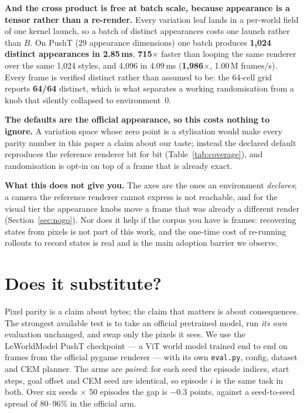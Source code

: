 \documentclass{article}
\begin{document}
\textbf{And the cross product is free at batch scale, because appearance is a
tensor rather than a re-render.} Every variation leaf lands in a per-world field
of one kernel launch, so a batch of distinct appearances costs one launch rather
than $B$. On PushT (29 appearance dimensions) one batch produces \textbf{1,024
distinct appearances in 2.85\,ms}, \textbf{715$\times$} faster than looping the
same renderer over the same 1,024 styles, and 4,096 in 4.09\,ms
(\textbf{1,986$\times$}, 1.00\,M frames/s).
Every frame is verified distinct rather than assumed to be: the 64-cell grid
reports \textbf{64/64} distinct, which is what separates a working randomisation
from a knob that silently collapsed to environment~0.

\textbf{The defaults are the official appearance, so this costs nothing to
ignore.} A variation space whose zero point is a stylisation would make every
parity number in this paper a claim about our taste; instead the declared
default reproduces the reference renderer bit for bit
(Table~\ref{tab:coverage}), and randomisation is opt-in on top of a frame that
is already exact.

\textbf{What this does not give you.} The axes are the ones an environment
\emph{declares}; a camera the reference renderer cannot express is not
reachable, and for the visual tier the appearance knobs move a frame that was
already a different render (Section~\ref{sec:nogo}). Nor does it help if the
corpus you have is frames: recovering states from pixels is not part of this
work, and the one-time cost of re-running rollouts to record states is real and
is the main adoption barrier we observe.

\section{Does it substitute?}
\label{sec:substitute}

Pixel parity is a claim about bytes; the claim that matters is about
consequences. The strongest available test is to take an official pretrained
model, run \emph{its own} evaluation unchanged, and swap only the pixels it
sees. We use the LeWorldModel PushT checkpoint --- a ViT world model trained
end to end on frames from the official pygame renderer --- with its own
\texttt{eval.py}, config, dataset and CEM planner. The arms are
\emph{paired}: for each seed the episode indices, start steps, goal offset and
CEM seed are identical, so episode $i$ is the same task in both. Over six
seeds $\times$ 50 episodes the gap is $-0.3$ points, against a seed-to-seed
spread of 80--96\% in the official arm.
\end{document}
